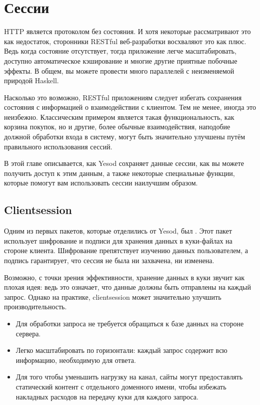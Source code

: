 \chapter{Сессии}\label{chap:sessions}

HTTP является протоколом без состояния. И хотя некоторые рассматривают это как
недостаток, сторонники RESTful веб-разработки восхваляют это как плюс. Ведь
когда состояние отсутствует, тогда приложение легче масштабировать, доступно
автоматическое кэширование и многие другие приятные побочные эффекты. В общем,
вы можете провести много параллелей с неизменяемой природой Haskell.

Насколько это возможно, RESTful приложениям следует избегать сохранения
состояния с информацией о взаимодействии с клиентом. Тем не менее, иногда это
неизбежно. Классическим примером является такая функциональность, как корзина
покупок, но и другие, более обычные взаимодействия, наподобие должной обработки
входа в систему, могут быть значительно улучшены путём правильного
использования сессий.

В этой главе описывается, как Yesod сохраняет данные сессии, как вы можете
получить доступ к этим данным, а также некоторые специальные функции, которые
помогут вам использовать сессии наилучшим образом.

\section{Clientsession}

Одним из первых пакетов, которые отделились от Yesod, был
.
Этот пакет использует шифрование и подписи для хранения данных в куки-файлах на
стороне клиента. Шифрование препятствует изучению данных пользователем, а
подпись гарантирует, что сессия не была ни захвачена, ни изменена.

Возможно, с точки зрения эффективности, хранение данных в куки звучит как
плохая идея: ведь это означает, что данные должны быть отправлены на каждый
запрос. Однако на практике, clientsession может значительно улучшить
производительность.

\begin{itemize}
  \item Для обработки запроса не требуется обращаться к базе данных на стороне
      сервера.

  \item Легко масштабировать по горизонтали: каждый запрос содержит всю
      информацию, необходимую для ответа.

  \item Для того чтобы уменьшить нагрузку на канал, сайты могут предоставлять
      статический контент с отдельного доменного имени, чтобы избежать
      накладных расходов на передачу куки для каждого запроса.
\end{itemize}

